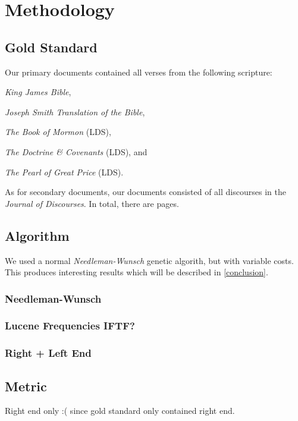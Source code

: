 \section {Methodology}

\subsection{Gold Standard}
Our primary documents contained all verses from the following scripture:
	\begin{description}
		\item \textit{King James Bible},
		\item \textit{Joseph Smith Translation of the Bible},
		\item \textit{The Book of Mormon} (LDS),
		\item \textit{The Doctrine \& Covenants} (LDS), and
		\item \textit{The Pearl of Great Price} (LDS).
	\end{description}

As for secondary documents, our documents consisted of all discourses in the \textit{Journal of Discourses}. In total, there are \JoDPagesTotal pages.

\subsection{Algorithm}
We used a normal \textit{Needleman-Wunsch} genetic algorith, but with variable costs. This produces interesting results which will be described in \ref{conclusion}.

\subsubsection{Needleman-Wunsch}


\subsubsection{Lucene Frequencies IFTF?}


\subsubsection{Right + Left End}



\subsection{Metric}
Right end only :( since gold standard only contained right end.

